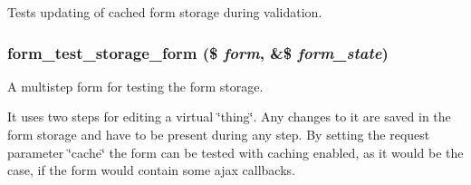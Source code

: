 Tests updating of cached form storage during validation. \hypertarget{form__test_8module_a842b92f357259c64dc7b2d2906aeb1f3}{
\subsubsection[{form\_\-test\_\-storage\_\-form}]{\setlength{\rightskip}{0pt plus 5cm}form\_\-test\_\-storage\_\-form (\$ {\em form}, \/  \&\$ {\em form\_\-state})}}
\label{form__test_8module_a842b92f357259c64dc7b2d2906aeb1f3}
A multistep form for testing the form storage.

It uses two steps for editing a virtual \char`\"{}thing\char`\"{}. Any changes to it are saved in the form storage and have to be present during any step. By setting the request parameter \char`\"{}cache\char`\"{} the form can be tested with caching enabled, as it would be the case, if the form would contain some ajax callbacks.

